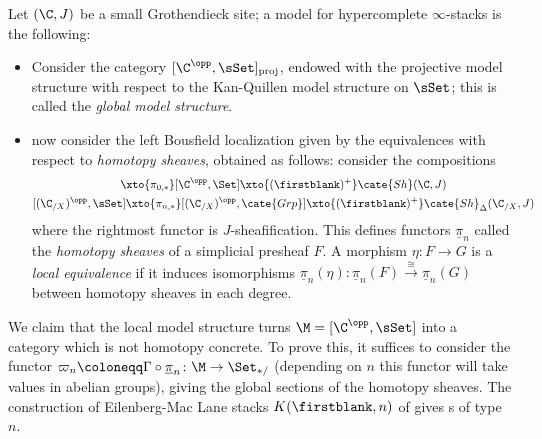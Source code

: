 \begin{example}\label{fasci}
Let $(\C, J)$ be a small Grothendieck site; a model for hypercomplete $\infty$-stacks is the following:
\begin{itemize}
	\item Consider the category $[\C^\opp, \sSet]_\text{proj}$, endowed with the projective model structure with respect to the Kan-Quillen model structure on $\sSet$; this is called the \emph{global model structure}.
	\item now consider the left Bousfield localization given by the equivalences with respect to \emph{homotopy sheaves}, obtained as follows: consider the compositions
	\begin{gather*}
	[\C^\opp,\sSet] \xto{\pi_{0,*}} [\C^\opp, \Set] \xto{(\firstblank)^+} \cate{Sh}(\C,J) \\
	[(\C_{/X})^\opp,\sSet] \xto{\pi_{n,*}} [(\C_{/X})^\opp,\cate{Grp}] \xto{(\firstblank)^+} \cate{Sh}_\Delta(\C_{/X},J)
	\end{gather*}
	where the rightmost functor is $J$-sheafification. This defines functors $\underline{\pi}_n$ called the \emph{homotopy sheaves} of a simplicial presheaf $F$. A morphism $\eta\colon F\to G$ is a \emph{local equivalence} if it induces isomorphisms $\underline{\pi}_n(\eta) \colon \underline{\pi}_n(F) \overset{\cong}\to \underline{\pi}_n(G)$ between homotopy sheaves in each degree.%
\end{itemize}
We claim that the local model structure turns $\M=[\C^\opp, \sSet]$ into a category which is not homotopy concrete. To prove this, it suffices to consider the functor $\varpi_n \coloneqq \Gamma \circ \underline{\pi}_n\colon \M \to \Set_{*/}$ (depending on $n$ this functor will take values in abelian groups), giving the global sections of the homotopy sheaves. The construction of Eilenberg-Mac Lane stacks $K(\firstblank,n)$ of \cite[§\textbf{2.2}]{toen2010simplicial} gives \wco{}s of type $n$.
\end{example}
